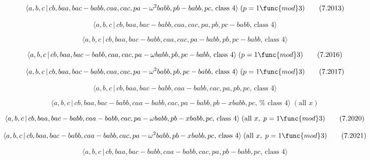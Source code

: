 \documentclass[10pt]{article}
\begin{document}
\begin{equation}
\langle a,b,c\,|\,cb,baa,bac-babb,caa,cac,pa-\omega ^{2}babb,pb-babb,pc,\,%
\text{class }4\rangle \;(p=1\func{mod}3)  \tag{7.2013}
\end{equation}

\begin{equation}
\langle a,b,c\,|\,cb,baa,bac-babb,caa,cac,pa,pb,pc-babb,\,\text{class }%
4\rangle  \tag{7.2014}
\end{equation}

\begin{equation}
\langle a,b,c\,|\,cb,baa,bac-babb,caa,cac,pa-babb,pb,pc-babb,\,\text{class }%
4\rangle  \tag{7.2015}
\end{equation}

\begin{equation}
\langle a,b,c\,|\,cb,baa,bac-babb,caa,cac,pa-\omega babb,pb,pc-babb,\,\text{%
class }4\rangle \;(p=1\func{mod}3)  \tag{7.2016}
\end{equation}

\begin{equation}
\langle a,b,c\,|\,cb,baa,bac-babb,caa,cac,pa-\omega ^{2}babb,pb,pc-babb,\,%
\text{class }4\rangle \;(p=1\func{mod}3)  \tag{7.2017}
\end{equation}

\begin{equation}
\langle a,b,c\,|\,cb,baa,bac-babb,caa-babb,cac,pa,pb,pc,\,\text{class }%
4\rangle  \tag{7.2018}
\end{equation}

\begin{equation}
\langle a,b,c\,|\,cb,baa,bac-babb,caa-babb,cac,pa-babb,pb-xbabb,pc,\,\text{%
class }4\rangle \;(\text{all }x)  \tag{7.2019}
\end{equation}

\begin{equation}
\langle a,b,c\,|\,cb,baa,bac-babb,caa-babb,cac,pa-\omega babb,pb-xbabb,pc,\,%
\text{class }4\rangle \;(\text{all }x,\;p=1\func{mod}3)  \tag{7.2020}
\end{equation}

\begin{equation}
\langle a,b,c\,|\,cb,baa,bac-babb,caa-babb,cac,pa-\omega
^{2}babb,pb-xbabb,pc,\,\text{class }4\rangle \;(\text{all }x,\;p=1\func{mod}%
3)  \tag{7.2021}
\end{equation}

\begin{equation}
\langle a,b,c\,|\,cb,baa,bac-babb,caa-babb,cac,pa,pb-babb,pc,\,\text{class }%
4\rangle  \tag{7.2022}
\end{equation}
\end{document}
